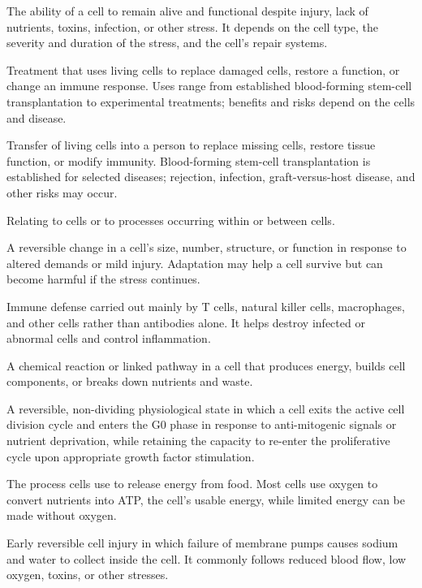  The ability of a cell to remain alive and functional despite injury, lack of nutrients, toxins, infection, or other stress. It depends on the cell type, the severity and duration of the stress, and the cell's repair systems.

 Treatment that uses living cells to replace damaged cells, restore a function, or change an immune response. Uses range from established blood-forming stem-cell transplantation to experimental treatments; benefits and risks depend on the cells and disease.

 Transfer of living cells into a person to replace missing cells, restore tissue function, or modify immunity. Blood-forming stem-cell transplantation is established for selected diseases; rejection, infection, graft-versus-host disease, and other risks may occur.

 Relating to cells or to processes occurring within or between cells.

 A reversible change in a cell's size, number, structure, or function in response to altered demands or mild injury. Adaptation may help a cell survive but can become harmful if the stress continues.

 Immune defense carried out mainly by T cells, natural killer cells, macrophages, and other cells rather than antibodies alone. It helps destroy infected or abnormal cells and control inflammation.

 A chemical reaction or linked pathway in a cell that produces energy, builds cell components, or breaks down nutrients and waste.

 A reversible, non-dividing physiological state in which a cell exits the active cell division cycle and enters the G0 phase in response to anti-mitogenic signals or nutrient deprivation, while retaining the capacity to re-enter the proliferative cycle upon appropriate growth factor stimulation.

 The process cells use to release energy from food. Most cells use oxygen to convert nutrients into ATP, the cell's usable energy, while limited energy can be made without oxygen.

 Early reversible cell injury in which failure of membrane pumps causes sodium and water to collect inside the cell. It commonly follows reduced blood flow, low oxygen, toxins, or other stresses.

